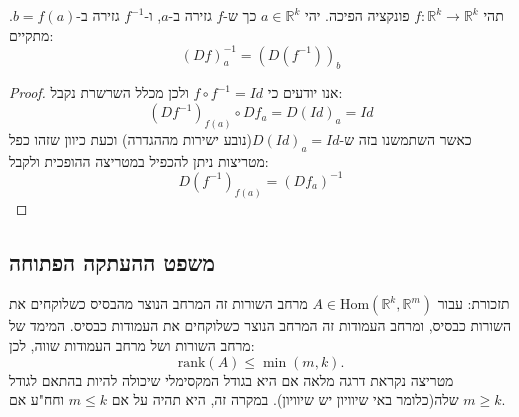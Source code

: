 \documentclass{tstextbook}
\begin{document}
\begin{proposition}
תהי \(f:\mathbb{R}^k\to\mathbb{R}^k\) פונקציה הפיכה. יהי \(a\in \mathbb{R}^k\) כך ש-\(f\) גזירה ב-\(a\), ו-\(f^{-1}\) גזירה ב-\(b=f(a)\). מתקיים:
$$\left(D f\right)_{a}^{-1}=\left(D\left(f^{-1}\right)\right)_{b}$$

\end{proposition}
\begin{proof}
אנו יודעים כי \(f\circ f^{-1}=Id\) ולכן מכלל השרשרת נקבל:
$$(Df^{-1})_{f(a)}\circ Df_{a}=D(Id)_{a}=Id$$
כאשר השתמשנו בזה ש-\(D(Id)_{a}=Id\)(נובע ישירות מההגדרה) וכעת כיוון שזהו כפל מטריצות ניתן להכפיל במטריצה ההופכית ולקבל:
$$D(f^{-1})_{f(a)}=(D f_{a})^{-1}$$

\end{proof}
\subsection{משפט ההעתקה הפתוחה}

תזכורת: עבור \(A\in \mathrm{Hom}\left( \mathbb{R}^k,\mathbb{R}^m \right)\) מרחב השורות זה המרחב הנוצר מהבסיס כשלוקחים את השורות כבסיס, ומרחב העמודות זה המרחב הנוצר כשלוקחים את העמודות כבסיס. המימד של מרחב השורות ושל מרחב העמודות שווה, לכן:
$$\mathrm{rank}(A)\leq\operatorname*{min}(m,k).$$
מטריצה נקראת דרגה מלאה אם היא בגודל המקסימלי שיכולה להיות בהתאם לגודל שלה(כלומר באי שיוויון יש שיוויון). במקרה זה, היא תהיה על אם \(m\leq k\) וחח"ע אם \(m\geq k\).
\end{document}
